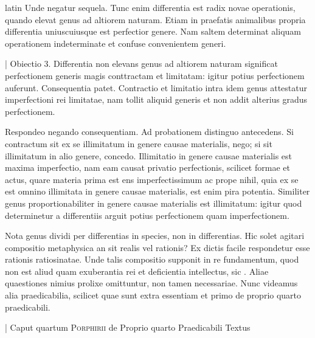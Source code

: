 \begin{otherlanguage*}{latin}
\pstart
 Unde negatur sequela. Tunc enim differentia est radix novae operationis, quando elevat genus ad altiorem naturam. Etiam in praefatis animalibus propria differentia uniuscuiusque est perfectior genere. Nam saltem determinat aliquam operationem indeterminate et confuse convenientem generi. 
\pend

\pstart
 \textnormal{|} Obiectio 3. Differentia non elevans genus ad altiorem naturam significat perfectionem generis magis conttractam et limitatam: igitur potius perfectionem auferunt. Consequentia patet. Contractio et limitatio intra idem genus attestatur imperfectioni rei limitatae, nam tollit aliquid generis et non addit alterius gradus perfectionem. 
\pend

\pstart
 Respondeo negando consequentiam. Ad probationem distinguo antecedens. Si contractum sit ex se illimitatum in genere causae materialis, nego; si sit illimitatum in alio genere, concedo. Illimitatio in genere causae materialis est maxima imperfectio, nam eam causat privatio perfectionis, scilicet formae et actus, quare materia prima est ens imperfectissimum ac prope nihil, quia ex se est omnino illimitata in genere causae materialis, est enim pira potentia. Similiter genus proportionabiliter in genere causae materialis est illimitatum: igitur quod determinetur a differentiis arguit potius perfectionem quam imperfectionem. 
\pend

\pstart
 Nota genus dividi per differentias in species, non in differentias. Hic solet agitari compositio metaphysica an sit realis vel rationis? Ex dictis facile respondetur esse rationis ratiosinatae. Unde talis compositio supponit in re fundamentum, quod non est aliud quam exuberantia rei et deficientia intellectus, sic . Aliae quaestiones nimius prolixe omittuntur, non tamen necessariae. Nunc videamus alia praedicabilia, scilicet quae sunt extra essentiam et primo de proprio quarto praedicabili. 
\pend

        \pstart
        \pend
      
        \pstart
        \pend
      
\pstart
\noindent%
 \textnormal{|}   Caput quartum \textsc{Porphirii} de Proprio quarto Praedicabili Textus 
\pend


\end{otherlanguage*}
